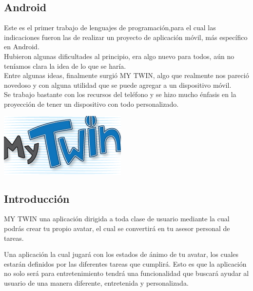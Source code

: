\documentclass[12pt]{article}
\begin{document}
{{{\begin{flushleft}
\section{Android}
\vspace{0.5in}
\normalsize
Este es el primer trabajo de lenguajes de programaci\'on,para el cual las indicaciones fueron las de realizar un proyecto de aplicaci\'on m\'ovil, más espec\'ifico en Android.\\
Hubieron algunas dificultades al principio, era algo nuevo para todos, a\'un no ten\'iamos clara la idea de lo que se har\'ia.\\
Entre algunas ideas, finalmente surgi\'o MY TWIN, algo que realmente nos pareci\'o novedoso y con alguna utilidad que se puede agregar a un dispositivo m\'ovil.\\
Se trabajo bastante con los recursos del tel\'efono y se hizo mucho \'enfasis en la proyecci\'on de tener un dispositivo con todo personalizado.
\begin{center}
\vspace{0.5in}
\includegraphics[scale=0.7]{imagenes_android/logo}
\end{center}
\end{flushleft}

\newpage
\begin{flushleft}
\subsection{Introducci\'on}

\normalsize
MY TWIN una aplicaci\'on dirigida a toda clase de usuario mediante la cual podr\'as crear tu propio avatar, el cual se convertir\'a en tu asesor personal de tareas.

Una aplicaci\'on la cual jugar\'a con los estados de \'animo de tu avatar, los cuales estar\'an definidos por las diferentes tareas que cumplir\'a. Esto es que la aplicaci\'on no solo ser\'a para entretenimiento tendr\'a una funcionalidad que buscar\'a ayudar al usuario de una manera diferente, entretenida y personalizada.\\


\end{flushleft}}}}
\end{document}
